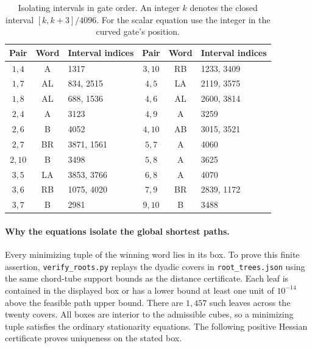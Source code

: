 \begin{table}[!ht]\centering\small
\caption{Isolating intervals in gate order. An integer $k$ denotes the
closed interval $[k,k+3]/4096$. For the scalar equation use the integer
in the curved gate's position.}\label{tab:rootboxes}
\begin{tabular}{@{}ccl@{\qquad}ccl@{}}\toprule
Pair & Word & Interval indices & Pair & Word & Interval indices\\\midrule
$1,4$ & A & 1317 & $3,10$ & RB & 1233, 3409\\
$1,7$ & AL & 834, 2515 & $4,5$ & LA & 2119, 3575\\
$1,8$ & AL & 688, 1536 & $4,6$ & AL & 2600, 3814\\
$2,4$ & A & 3123 & $4,9$ & A & 3259\\
$2,6$ & B & 4052 & $4,10$ & AB & 3015, 3521\\
$2,7$ & BR & 3871, 1561 & $5,7$ & A & 4060\\
$2,10$ & B & 3498 & $5,8$ & A & 3625\\
$3,5$ & LA & 3853, 3766 & $6,8$ & A & 4070\\
$3,6$ & RB & 1075, 4020 & $7,9$ & BR & 2839, 1172\\
$3,7$ & B & 2981 & $9,10$ & B & 3488\\\bottomrule
\end{tabular}
\end{table}

\paragraph{Why the equations isolate the global shortest paths.}
Every minimizing tuple of the winning word lies in its box. To prove this
finite assertion, \texttt{verify\_roots.py} replays the dyadic covers in
\texttt{root\_trees.json} using the same chord-tube support bounds as the
distance certificate. Each leaf is contained in the displayed box or has
a lower bound at least one unit of $10^{-14}$ above the feasible path
upper bound. There are $1{,}457$ such leaves across the twenty covers.
All boxes are interior to the admissible cubes, so a minimizing tuple
satisfies the ordinary stationarity equations. The following positive
Hessian certificate proves uniqueness on the stated box.

